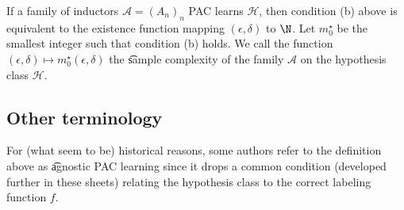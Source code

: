 If a family of inductors $\mathcal{A}  = (A_n)_n$ PAC learns $\mathcal{H} $, then condition (b) above is equivalent to the existence function mapping $(\epsilon , \delta )$ to $\N  $.
Let $m_0^\star$ be the smallest integer such that condition (b) holds.
We call the function $(\epsilon , \delta ) \mapsto m_0^\star(\epsilon ,\delta )$ the \t{sample complexity} of the family $\mathcal{A} $ on the hypothesis class $\mathcal{H} $.

\subsection*{Other terminology}

For (what seem to be) historical reasons, some authors refer to the definition above as \t{agnostic PAC learning} since it drops a common condition (developed further in these sheets) relating the hypothesis class to the correct labeling function $f$.

\blankpage